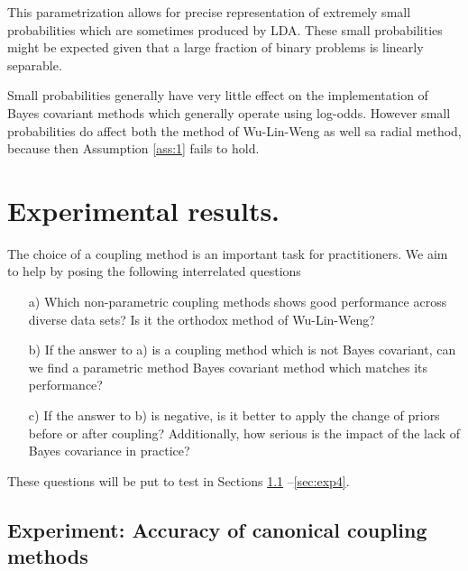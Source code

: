 This parametrization allows for precise representation of extremely small probabilities which are sometimes produced by LDA. These small probabilities might be expected given that a large fraction of binary problems is linearly separable. 

Small probabilities generally have very little effect on the implementation of Bayes covariant methods which generally operate using log-odds. However small probabilities do affect both the method of Wu-Lin-Weng as well sa radial method, because then Assumption \ref{ass:1} fails to hold. 


\section{Experimental results.}

The choice of a coupling method is an important task for practitioners. We aim to help by posing the following interrelated questions 

\begin{itemize}
\item[a)] Which non-parametric coupling methods shows good performance across diverse data sets? Is it the orthodox method of Wu-Lin-Weng?
\item[b)] If the answer to a) is a coupling method which is not Bayes covariant, can we find a parametric method Bayes covariant method which  matches its performance?
\item[c)] If the answer to b) is negative, is it better to apply the change of priors before or after coupling? Additionally, how serious is the impact of the lack of Bayes covariance in practice?
\end{itemize}

These questions will be put to test in Sections \ref{sec:exp1} --\ref{sec:exp4}.



\subsection{Experiment: Accuracy of canonical coupling methods} \label{sec:exp1}

